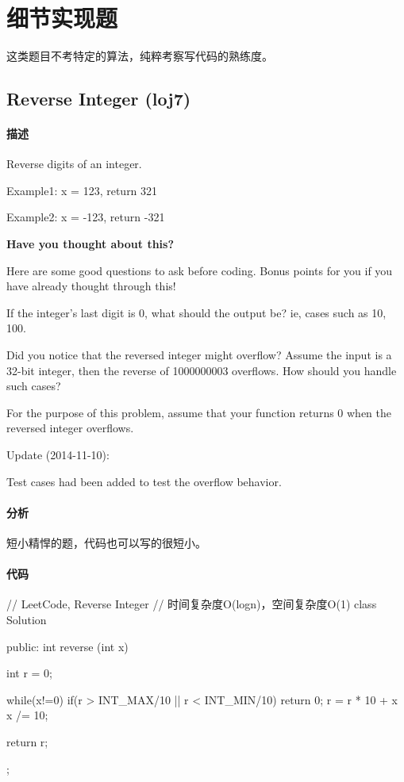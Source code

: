 \chapter{细节实现题}
这类题目不考特定的算法，纯粹考察写代码的熟练度。


\section{Reverse Integer (loj7)} %
\label{sec:reverse-integer}


\subsubsection{描述}
Reverse digits of an integer.

Example1: x = 123, return 321

Example2: x = -123, return -321


\textbf{Have you thought about this?}

Here are some good questions to ask before coding. Bonus points for you if you have already thought through this!

If the integer's last digit is 0, what should the output be? ie, cases such as 10, 100.

Did you notice that the reversed integer might overflow? Assume the input is a 32-bit integer, then the reverse of 1000000003 overflows. How should you handle such cases?

For the purpose of this problem, assume that your function returns 0 when the reversed integer overflows.

Update (2014-11-10):

Test cases had been added to test the overflow behavior.

\subsubsection{分析}
短小精悍的题，代码也可以写的很短小。


\subsubsection{代码}
\begin{Code}
// LeetCode, Reverse Integer
// 时间复杂度O(logn)，空间复杂度O(1)
class Solution {
public:
    int reverse (int x) {
        int r = 0;

        while(x!=0) {
            if(r > INT_MAX/10 || r < INT_MIN/10) {
                return 0;
            }
            r = r * 10 + x %
            x /= 10;
        }
        
        return r;
    }
};
\end{Code}


